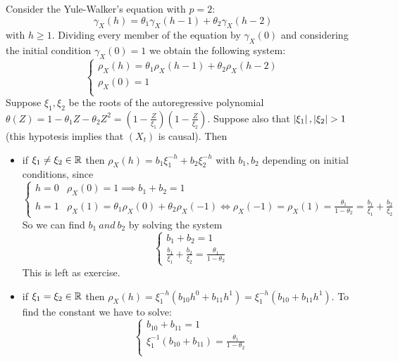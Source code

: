 \begin{example}
    Consider the Yule-Walker's equation with $p=2$:
    \[
        \gamma_X(h)=\theta_1\gamma_X(h-1)+\theta_2\gamma_X(h-2)  
    \]
    with $h\ge1$. Dividing every member of the equation by $\gamma_X(0)$ and considering the initial condition $\gamma_X(0)=1$ we obtain the following system:
    \[
        \begin{cases}
            \rho_X(h)=\theta_1\rho_X(h-1)+\theta_2\rho_X(h-2)\\
            \rho_X(0)=1\\
        \end{cases}  
    \]
    Suppose $\xi_1,\xi_2$ be the roots of the autoregressive polynomial $\theta(Z)=1-\theta_1Z-\theta_2Z^2=\left(1-\frac{Z}{\xi_1}\right)\left(1-\frac{Z}{\xi_2}\right)$. Suppose also that $\abs{\xi_1},\abs{\xi_2}>1$ (this hypotesis implies that $(X_t)$ is causal). Then
    \begin{itemize}
        \item if $\xi_1\ne\xi_2\in\mathbb{R}$ then $\rho_X(h)=b_1\xi_1^{-h}+b_2\xi_2^{-h}$ with $b_1,b_2$ depending on initial conditions, since
            \[
                \begin{cases}
                    h=0&\rho_X(0)=1\implies b_1+b_2=1\\
                    h=1&\rho_X(1)=\theta_1\rho_X(0)+\theta_2\rho_X(-1)\iff\rho_X(-1)=\rho_X(1)=\frac{\theta_1}{1-\theta_2}=\frac{b_1}{\xi_1}+\frac{b_2}{\xi_2}
                \end{cases}  
            \]
            So we can find $b_1\ and\ b_2$ by solving the system
            \[
                \begin{cases}
                    b_1+b_2=1\\
                    \frac{b_1}{\xi_1}+\frac{b_2}{\xi_2}=\frac{\theta_1}{1-\theta_2}
                \end{cases}  
            \]
            This is left as exercise.
        \item if $\xi_1=\xi_2\in\mathbb{R}$ then $\rho_X(h)=\xi_1^{-h}(b_{10}h^0+b_{11}h^1)=\xi_1^{-h}(b_{10}+b_{11}h^1)$. To find the constant we have to solve:
            \[
                \begin{cases}
                    b_{10}+b_{11}=1\\
                    \xi_1^{-1}(b_{10}+b_{11})=\frac{\theta_1}{1-\theta_2}\\
                \end{cases}  
            \]
    \end{itemize}

\end{example}
